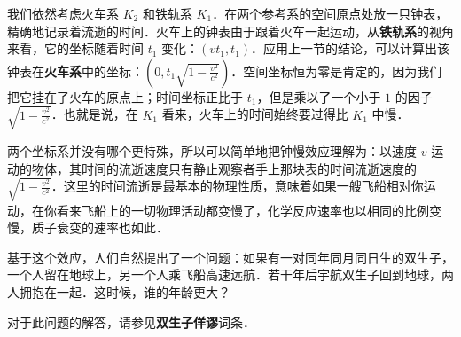 我们依然考虑火车系 $K_2$ 和铁轨系 $K_1$．在两个参考系的空间原点处放一只钟表，精确地记录着流逝的时间．火车上的钟表由于跟着火车一起运动，从\textbf{铁轨系}的视角来看，它的坐标随着时间 $t_1$ 变化：$(vt_1, t_1)$．应用上一节的结论，可以计算出该钟表在\textbf{火车系}中的坐标：$(0, t_1\sqrt{1-\frac{v^2}{c^2}})$．空间坐标恒为零是肯定的，因为我们把它挂在了火车的原点上；时间坐标正比于 $t_1$，但是乘以了一个小于 $1$ 的因子 $\sqrt{1-\frac{v^2}{c^2}}$．也就是说，在 $K_1$ 看来，火车上的时间始终要过得比 $K_1$ 中慢．

两个坐标系并没有哪个更特殊，所以可以简单地把钟慢效应理解为：以速度 $v$ 运动的物体，其时间的流逝速度只有静止观察者手上那块表的时间流逝速度的 $\sqrt{1-\frac{v^2}{c^2}}$．这里的时间流逝是最基本的物理性质，意味着如果一艘飞船相对你运动，在你看来飞船上的一切物理活动都变慢了，化学反应速率也以相同的比例变慢，质子衰变的速率也如此．

基于这个效应，人们自然提出了一个问题：如果有一对同年同月同日生的双生子，一个人留在地球上，另一个人乘飞船高速远航．若干年后宇航双生子回到地球，两人拥抱在一起．这时候，谁的年龄更大？

对于此问题的解答，请参见\textbf{双生子佯谬}词条．

